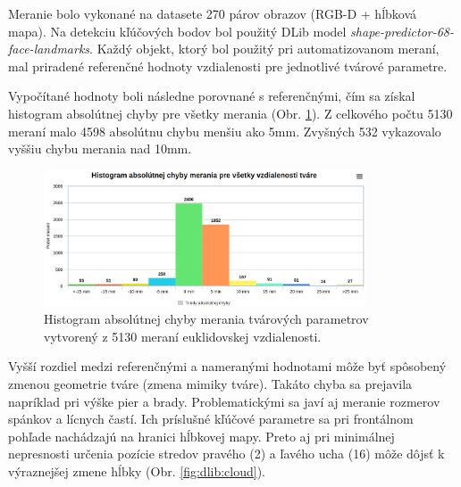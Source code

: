 \vskip 0.2in
Meranie bolo vykonané na datasete 270 párov obrazov (RGB-D + hĺbková mapa). Na detekciu kľúčových bodov bol použitý DLib model \textit{shape-predictor-68-face-landmarks}. Každý objekt, ktorý bol použitý pri automatizovanom meraní, mal priradené referenčné hodnoty vzdialenosti pre jednotlivé tvárové parametre. 


Vypočítané hodnoty boli následne porovnané s referenčnými, čím sa získal histogram absolútnej chyby pre všetky merania (Obr. \ref{fig:histogram}). Z celkového počtu 5130 meraní malo 4598 absolútnu chybu menšiu ako 5mm. Zvyšných 532 vykazovalo vyššiu chybu merania nad 10mm. 

\begin{figure}[H]
	\centering
	\includegraphics[width=0.85\textwidth]{figures/plot.png}
	\caption{Histogram absolútnej chyby merania tvárových parametrov vytvorený z 5130 meraní euklidovskej vzdialenosti.}
	\label{fig:histogram}
\end{figure}

Vyšší rozdiel medzi referenčnými a nameranými hodnotami môže byť spôsobený zmenou geometrie tváre (zmena mimiky tváre). Takáto chyba sa prejavila napríklad pri výške pier a brady. Problematickými sa javí aj meranie rozmerov spánkov a lícnych častí. Ich príslušné kľúčové parametre sa pri frontálnom pohľade nachádzajú na hranici hĺbkovej mapy. Preto aj pri minimálnej nepresnosti určenia pozície stredov pravého (2) a ľavého ucha (16) môže dôjsť k výraznejšej zmene hĺbky (Obr. \ref{fig:dlib:cloud}). 

